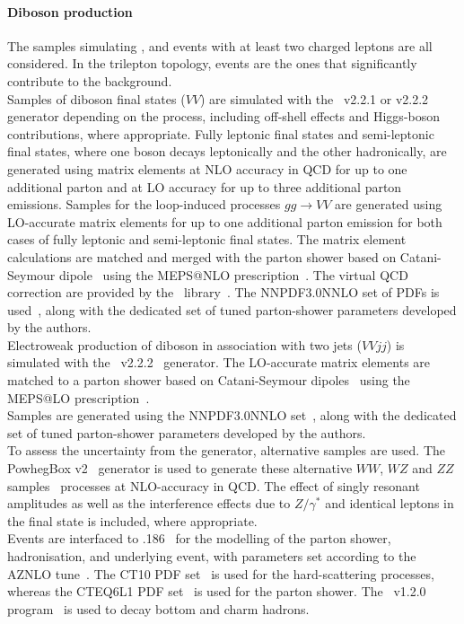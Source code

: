 \paragraph{Diboson production} 
The samples simulating \PW{}\PW, \PW{}\PZ and \PZ{}\PZ events with at least two charged leptons are all considered.
In the trilepton topology, \PW{}\PZ events are the ones that significantly contribute to the background.\\
Samples of diboson final states ($VV$) are simulated with the
\sherpa~v2.2.1 or v2.2.2~\cite{Bothmann:2019yzt} generator depending on the process,
including off-shell effects and Higgs-boson contributions, where appropriate.
Fully leptonic final states and semi-leptonic final states, where one boson
decays leptonically and the other hadronically, are generated using
matrix elements at NLO accuracy in QCD for up to one additional parton
and at LO accuracy for up to three additional parton
emissions. Samples for the loop-induced processes $gg \to VV$ are
generated using LO-accurate matrix elements for up to one
additional parton emission for both cases of fully leptonic and
semi-leptonic final states. The matrix element calculations are matched
and merged with the \sherpa parton shower based on Catani-Seymour
dipole~\cite{Gleisberg:2008fv,Schumann:2007mg} using the MEPS@NLO
prescription~\cite{Hoeche:2011fd,Hoeche:2012yf,Catani:2001cc,Hoeche:2009rj}.
The virtual QCD correction are provided by the
\openloops\ library~\cite{Cascioli:2011va,Denner:2016kdg}. The 
\textsc{NNPDF3.0NNLO} set of PDFs is used~\cite{Ball:2014uwa}, along with the
dedicated set of tuned parton-shower parameters developed by the
\sherpa authors.\\
Electroweak production of diboson in association with two jets
($VVjj$) is simulated with the \sherpa~v2.2.2~\cite{Bothmann:2019yzt}
generator. The LO-accurate matrix elements are matched to a parton
shower based on Catani-Seymour dipoles~\cite{Gleisberg:2008fv,Schumann:2007mg} using the MEPS@LO
prescription~\cite{Hoeche:2011fd,Hoeche:2012yf,Catani:2001cc,Hoeche:2009rj}.\\
Samples are generated using the \textsc{NNPDF3.0NNLO} set~\cite{Ball:2014uwa},
along with the dedicated set of tuned parton-shower parameters
developed by the \sherpa authors.\\
To assess the uncertainty from the generator, alternative samples are used. 
The PowhegBox v2~\cite{Nason:2004rx,Frixione:2007vw,Alioli:2010xd} generator
is used to generate these alternative $WW$, $WZ$ and $ZZ$ samples~\cite{Nason:2013ydw}
processes at NLO-accuracy in QCD. The effect of singly resonant
amplitudes as well as the interference effects due to $Z/\gamma^*$ and
identical leptons in the final state is included, where appropriate. \\
Events are interfaced to \pythia{}.186~\cite{Sjostrand:2007gs}
for the modelling of the parton shower, hadronisation, and underlying
event, with parameters set according to the AZNLO
tune~\cite{STDM-2012-23}. The CT10 PDF set~\cite{Lai:2010vv} is used
for the hard-scattering processes, whereas the CTEQ6L1 PDF
set~\cite{Pumplin:2002vw} is used for the parton shower. The \evtgen~v1.2.0
program~\cite{EvtGen} is used to decay bottom and charm hadrons.

